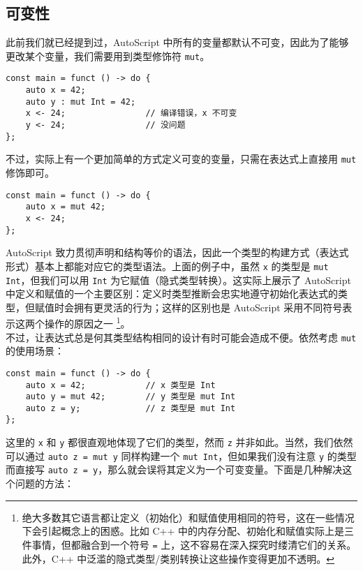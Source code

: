 \subsection{可变性}

此前我们就已经提到过，AutoScript 中所有的变量都默认不可变，因此为了能够更改某个变量，我们需要用到类型修饰符 \lstinline!mut!。

\begin{lstlisting}
const main = funct () -> do {
    auto x = 42;
    auto y : mut Int = 42;
    x <- 24;                // 编译错误，x 不可变
    y <- 24;                // 没问题
};
\end{lstlisting}

不过，实际上有一个更加简单的方式定义可变的变量，只需在表达式上直接用 \lstinline!mut! 修饰即可。

\begin{lstlisting}
const main = funct () -> do {
    auto x = mut 42;
    x <- 24;
};
\end{lstlisting}

AutoScript 致力贯彻声明和结构等价的语法，因此一个类型的构建方式（表达式形式）基本上都能对应它的类型语法。上面的例子中，虽然 \lstinline!x! 的类型是 \lstinline!mut Int!，但我们可以用 \lstinline!Int! 为它赋值（隐式类型转换）。这实际上展示了 AutoScript 中定义和赋值的一个主要区别：定义时类型推断会忠实地遵守初始化表达式的类型，但赋值时会拥有更灵活的行为；这样的区别也是 AutoScript 采用不同符号表示这两个操作的原因之一 \footnote{绝大多数其它语言都让定义（初始化）和赋值使用相同的符号，这在一些情况下会引起概念上的困惑。比如 C++ 中的内存分配、初始化和赋值实际上是三件事情，但都融合到一个符号 \lstinline!=! 上，这不容易在深入探究时缕清它们的关系。此外，C++ 中泛滥的隐式类型/类别转换让这些操作变得更加不透明。}。 \\

不过，让表达式总是何其类型结构相同的设计有时可能会造成不便。依然考虑 \lstinline!mut! 的使用场景：

\begin{minipage}[c]{0.95\textwidth}
\vspace{1.0em}
\begin{lstlisting}
const main = funct () -> do {
	auto x = 42;			// x 类型是 Int
	auto y = mut 42;		// y 类型是 mut Int
	auto z = y;				// z 类型是 mut Int
};
\end{lstlisting}
\end{minipage}

这里的 \lstinline!x! 和 \lstinline!y! 都很直观地体现了它们的类型，然而 \lstinline!z! 并非如此。当然，我们依然可以通过 \lstinline!auto z = mut y! 同样构建一个 \lstinline!mut Int!，但如果我们没有注意 \lstinline!y! 的类型而直接写 \lstinline!auto z = y!，那么就会误将其定义为一个可变变量。下面是几种解决这个问题的方法：

